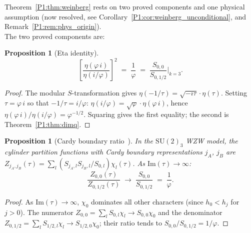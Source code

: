 \documentclass[11pt,a4paper]{article}
\newtheorem{proposition}[theorem]{Proposition}
\theoremstyle{definition}
\theoremstyle{remark}
\newcommand{\vp}{\varphi}
\begin{document}
Theorem~\ref{P1:thm:weinberg} rests on two proved components and one physical assumption (now resolved, see Corollary~\ref{P1:cor:weinberg_unconditional}, and Remark~\ref{P1:rem:phys_origin}).\\
The two proved components are:

\begin{proposition}[Eta identity]
    \label{P1:prop:eta}
    \begin{equation}
      \left[\frac{\eta(\vp\,i)}{\eta(i/\vp)}\right]^{\!2}
      \;=\; \frac{1}{\vp}
      \;=\; \frac{S_{0,0}}{S_{0,1/2}}\bigg|_{k=3}.
      \label{P1:eq:eta_identity}
    \end{equation}
    \end{proposition}
    \begin{proof}
    The modular $S$-transformation gives
    $\eta(-1/\tau)=\sqrt{-i\tau}\cdot\eta(\tau)$.
    Setting $\tau=\vp\,i$ so that $-1/\tau=i/\vp$:
    $\eta(i/\vp)=\sqrt{\vp}\cdot\eta(\vp\,i)$,
    hence $\eta(\vp\,i)/\eta(i/\vp)=\vp^{-1/2}$.
    Squaring gives the first equality; the second is
    Theorem~\ref{P1:thm:dimq}.
    \end{proof}

    \begin{proposition}[Cardy boundary ratio~\cite{Cardy1989}]
    \label{P1:prop:cardy}
    In the $\mathrm{SU}(2)_3$ WZW model, the cylinder partition
    functions with Cardy boundary representations $j_A$, $j_B$ are
    $Z_{j_A,j_B}(\tau)=\sum_l(S_{j_A,l}S_{j_B,l}/S_{0,l})\chi_l(\tau)$.
    As $\mathrm{Im}(\tau)\to\infty$:
    \begin{equation}
      \frac{Z_{0,0}(\tau)}{Z_{0,1/2}(\tau)}
      \;\longrightarrow\;
      \frac{S_{0,0}}{S_{0,1/2}}
      \;=\; \frac{1}{\vp}.
      \label{P1:eq:cardy_ratio}
    \end{equation}
    \end{proposition}
    \begin{proof}
    As $\mathrm{Im}(\tau)\to\infty$, $\chi_0$ dominates all other
    characters (since $h_0<h_j$ for $j>0$).
    The numerator $Z_{0,0}=\sum_l S_{0,l}\chi_l\to S_{0,0}\chi_0$
    and the denominator $Z_{0,1/2}=\sum_l S_{1/2,l}\chi_l\to S_{1/2,0}\chi_0$;
    their ratio tends to $S_{0,0}/S_{0,1/2}=1/\vp$.
    \end{proof}
\end{document}
